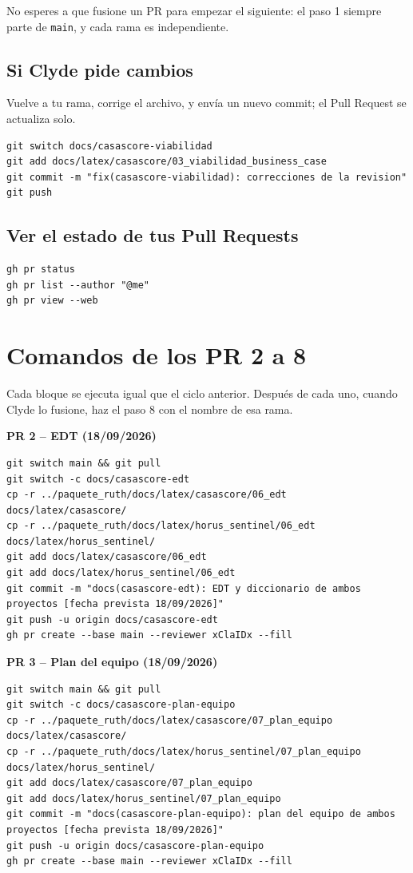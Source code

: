 \documentclass[11pt,a4paper]{article}
\begin{document}
\noindent No esperes a que fusione un PR para empezar el siguiente: el paso 1 siempre parte de \texttt{main}, y cada rama es independiente.

\subsection{Si Clyde pide cambios}
Vuelve a tu rama, corrige el archivo, y envía un nuevo commit; el Pull Request se actualiza solo.
\begin{lstlisting}
git switch docs/casascore-viabilidad
git add docs/latex/casascore/03_viabilidad_business_case
git commit -m "fix(casascore-viabilidad): correcciones de la revision"
git push
\end{lstlisting}

\subsection{Ver el estado de tus Pull Requests}
\begin{lstlisting}
gh pr status
gh pr list --author "@me"
gh pr view --web
\end{lstlisting}

\section{Comandos de los PR 2 a 8}
Cada bloque se ejecuta igual que el ciclo anterior. Después de cada uno, cuando Clyde lo fusione, haz el paso 8 con el nombre de esa rama.

\vspace{0.1cm}
\noindent\textbf{PR 2 -- EDT (18/09/2026)}
\begin{lstlisting}
git switch main && git pull
git switch -c docs/casascore-edt
cp -r ../paquete_ruth/docs/latex/casascore/06_edt docs/latex/casascore/
cp -r ../paquete_ruth/docs/latex/horus_sentinel/06_edt docs/latex/horus_sentinel/
git add docs/latex/casascore/06_edt
git add docs/latex/horus_sentinel/06_edt
git commit -m "docs(casascore-edt): EDT y diccionario de ambos proyectos [fecha prevista 18/09/2026]"
git push -u origin docs/casascore-edt
gh pr create --base main --reviewer xClaIDx --fill
\end{lstlisting}

\noindent\textbf{PR 3 -- Plan del equipo (18/09/2026)}
\begin{lstlisting}
git switch main && git pull
git switch -c docs/casascore-plan-equipo
cp -r ../paquete_ruth/docs/latex/casascore/07_plan_equipo docs/latex/casascore/
cp -r ../paquete_ruth/docs/latex/horus_sentinel/07_plan_equipo docs/latex/horus_sentinel/
git add docs/latex/casascore/07_plan_equipo
git add docs/latex/horus_sentinel/07_plan_equipo
git commit -m "docs(casascore-plan-equipo): plan del equipo de ambos proyectos [fecha prevista 18/09/2026]"
git push -u origin docs/casascore-plan-equipo
gh pr create --base main --reviewer xClaIDx --fill
\end{lstlisting}
\end{document}
